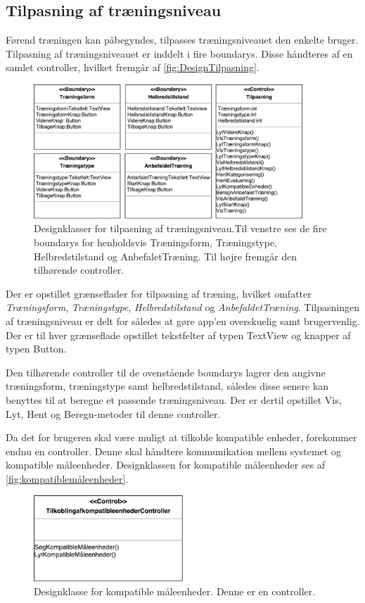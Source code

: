 \subsection*{Tilpasning af træningsniveau}
Førend træningen kan påbegyndes, tilpasses træningsniveauet den enkelte bruger. Tilpasning af træningsniveauet er inddelt i fire boundarys. Disse håndteres af en samlet controller, hvilket fremgår af \autoref{fig:DesignTilpasning}.

\begin{figure} [H]
\centering
\includegraphics[width=0.9\textwidth]{figures/MVC/MVCTilpasning}
\caption{Designklasser for tilpasning af træningsniveau.Til venstre ses de fire boundarys for henholdsvis Træningsform, Træningstype, Helbredstilstand og AnbefaletTræning. Til højre fremgår den tilhørende controller.}
\label{fig:DesignTilpasning}
\end{figure}

\noindent
Der er opstillet grænseflader for tilpasning af træning, hvilket omfatter \textit{Træningsform}, \textit{Træningstype}, \textit{Helbredstilstand} og \textit{AnbefaldetTræning}. Tilpasningen af træningsniveau er delt for således at gøre app’en overskuelig samt brugervenlig. Der er til hver grænseflade opstillet tekstfelter af typen TextView og knapper af typen Button.   

Den tilhørende controller til de ovenstående boundarys lagrer den angivne træningsform, træningstype samt helbredstilstand, således disse senere kan benyttes til at beregne et passende træningsniveau. Der er dertil opstillet Vis, Lyt, Hent og Beregn-metoder til denne controller. 

Da det for brugeren skal være muligt at tilkoble kompatible enheder, forekommer endnu en controller. Denne skal håndtere kommunikation mellem systemet og kompatible måleenheder. Designklassen for kompatible måleenheder ses af \autoref{fig:kompatiblemåleenheder}.

\begin{figure} [H]
\centering
\includegraphics[width=0.5\textwidth]{figures/MVC/MVCKompMaale}
\caption{Designklasse for kompatible måleenheder. Denne er en controller.}
\label{fig:kompatiblemåleenheder}
\end{figure}

